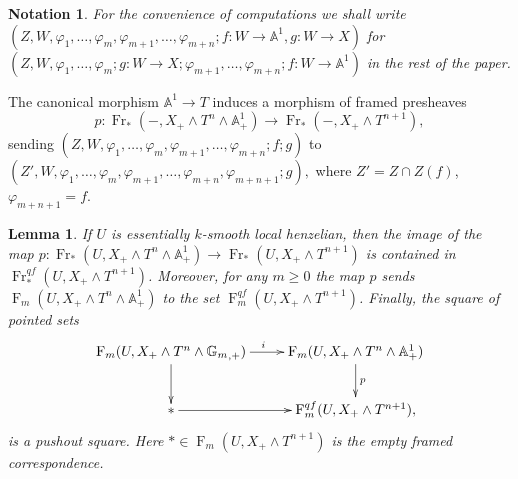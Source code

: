 \documentclass[a4paper,11pt,reqno]{amsart}
\newtheorem{lemma}[theorem]{Lemma}
\newtheorem{notation}[theorem]{Notation}
\begin{document}
\begin{notation}{\rm
For the convenience of computations we shall write
$(Z,W,{\varphi}_1,\ldots,{\varphi}_{m},{\varphi}_{m+1},\ldots,{\varphi}_{m+n};f:W\to
{\mathbb{A}}^1,g:W\to X)$ for $(Z,W,{\varphi}_1,\ldots,{\varphi}_{m};g:W\to
X;{\varphi}_{m+1},\ldots,{\varphi}_{m+n};f:W\to {\mathbb{A}}^1)$ in the rest of the
paper.

}\end{notation}

The canonical morphism ${\mathbb{A}}^1\to T$ induces a morphism of framed
presheaves
   $$p:{\operatorname{Fr}}_*(-,X_+\wedge T^{n}\wedge {\mathbb{A}}^1_+) \to {\operatorname{Fr}}_*(-,X_+\wedge T^{n+1}),$$
sending
$(Z,W,{\varphi}_1,\ldots,{\varphi}_{m},{\varphi}_{m+1},\ldots,{\varphi}_{m+n};f;g)$ to
$(Z',W,{\varphi}_1,\ldots,{\varphi}_{m},{\varphi}_{m+1},\ldots,{\varphi}_{m+n},{\varphi}_{m+n+1};g),$
where $Z'=Z\cap Z(f)$, ${\varphi}_{m+n+1}=f$.

\begin{lemma}\label{l:pushout}
If $U$ is essentially $k$-smooth local henzelian, then the image of
the map $p:{\operatorname{Fr}}_*(U,X_+\wedge T^{n}\wedge {\mathbb{A}}^1_+) \to
{\operatorname{Fr}}_*(U,X_+\wedge T^{n+1})$ is contained in ${\operatorname{Fr}}^{qf}_*(U,X_+\wedge
T^{n+1})$. Moreover, for any $m{\geqslant} 0$ the map $p$ sends
${\operatorname{F}}_m(U,X_+\wedge T^{n}\wedge {\mathbb{A}}^1_+)$ to the set
${\operatorname{F}}^{qf}_m(U,X_+\wedge T^{n+1})$. Finally, the square of pointed
sets
$$\xymatrix{{\operatorname{F}}_m(U,X_+\wedge T^{n}\wedge {{\mathbb{G}_m}}_{,+}) \ar[r]^{i}\ar[d]_{}& {\operatorname{F}}_m(U,X_+\wedge T^{n}\wedge {\mathbb{A}}^1_+) \ar^{p}[d]\\
               {*} \ar[r]^{}&  {\operatorname{F}}^{qf}_m(U,X_+\wedge T^{n+1}), }$$
is a pushout square. Here ${*} \in {\operatorname{F}}_m(U,X_+\wedge T^{n+1})$ is the
empty framed correspondence.
\end{lemma}
\end{document}
